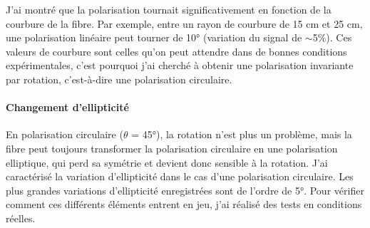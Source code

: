 J'ai montré que la polarisation tournait significativement en fonction de la courbure de la fibre. Par exemple, entre un rayon de courbure de 15 cm et 25 cm, une polarisation linéaire peut tourner de 10° (variation du signal de $\sim$5\%). Ces valeurs de courbure sont celles qu'on peut attendre dans de bonnes conditions expérimentales, c'est pourquoi j'ai cherché à obtenir une polarisation invariante par rotation, c'est-à-dire une polarisation circulaire.


\paragraph{Changement d'ellipticité}

En polarisation circulaire ($\theta$ = 45°), la rotation n'est plus un problème, mais la fibre peut toujours transformer la polarisation circulaire en une polarisation elliptique, qui perd sa symétrie et devient donc sensible à la rotation. J'ai caractérisé la variation d'ellipticité dans le cas d'une polarisation circulaire. Les plus grandes variations d'ellipticité enregistrées sont de l'ordre de 5°. Pour vérifier comment ces différents éléments entrent en jeu, j'ai réalisé des tests en conditions réelles.

